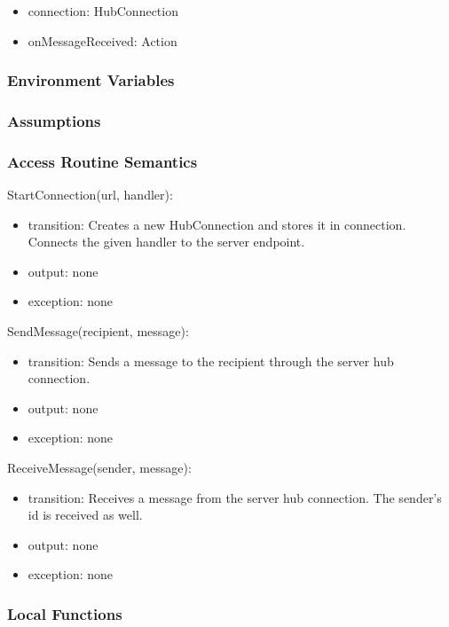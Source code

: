 \documentclass[12pt, titlepage]{article}
\begin{document}
\begin{itemize}
\begin{itemize}
\item connection: HubConnection
\item onMessageReceived: Action
\end{itemize}

\subsubsection{Environment Variables}

\subsubsection{Assumptions}

\subsubsection{Access Routine Semantics}

\noindent StartConnection(url, handler):
\begin{itemize}
\item transition: Creates a new HubConnection and stores it in connection. Connects the given handler to the server endpoint.
\item output: none
\item exception: none
\end{itemize}

\noindent SendMessage(recipient, message):
\begin{itemize}
\item transition: Sends a message to the recipient through the server hub connection.
\item output: none
\item exception: none
\end{itemize}

\noindent ReceiveMessage(sender, message):
\begin{itemize}
\item transition: Receives a message from the server hub connection. The sender's id is received as well.
\item output: none
\item exception: none
\end{itemize}

\subsubsection{Local Functions}


\end{itemize}
\end{document}
